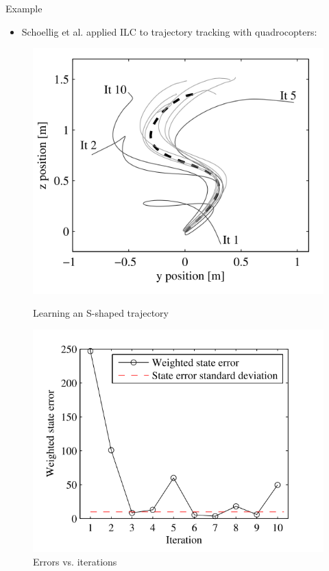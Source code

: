 \documentclass{beamer}
\begin{document}
\begin{frame}{Example}
\begin{itemize}
\item Schoellig et al. \cite{ILC_Angela} applied ILC to trajectory tracking with quadrocopters: \pause
\end{itemize}
\begin{figure}[!htb]
  \includegraphics[width=\linewidth]{ilc.png}
  \caption{Learning an S-shaped trajectory}
\endminipage\hfill
{}
  \includegraphics[width=\linewidth]{ilc_error.png}
  \caption{Errors vs. iterations}
\endminipage
\end{figure}
\end{frame}
\end{document}
